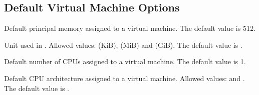 \documentclass[letterpaper,10pt,english]{sphinxmanual}
\begin{document}
\subsection{Default Virtual Machine Options}
\label{manual:default-virtual-machine-options}

\begin{fulllineitems}
\label{manual:confval-DEFAULT_VM_MEMORY}
Default principal memory assigned to a virtual machine.
The default value is 512.

\end{fulllineitems}


\begin{fulllineitems}
\label{manual:confval-DEFAULT_VM_MEMORY_UNIT}
Unit used in {\hyperref[manual:confval-DEFAULT_VM_MEMORY]{}}.
Allowed values:  (KiB),  (MiB) and  (GiB).
The default value is .

\end{fulllineitems}


\begin{fulllineitems}
\label{manual:confval-DEFAULT_VM_CPUS}
Default number of CPUs assigned to a virtual machine.
The default value is 1.

\end{fulllineitems}


\begin{fulllineitems}
\label{manual:confval-DEFAULT_VM_CPU_ARCH}
Default CPU architecture assigned to a virtual machine.
Allowed values:  and .
The default value is .

\end{fulllineitems}

\end{document}
